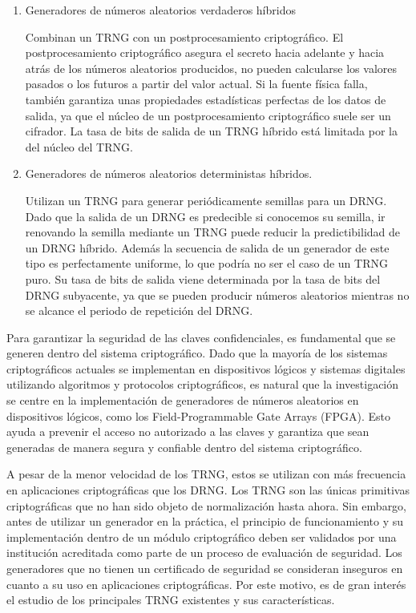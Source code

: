         \begin{enumerate}		
            \item Generadores de números aleatorios verdaderos híbridos
            
            Combinan un TRNG con un postprocesamiento criptográfico. El postprocesamiento criptográfico asegura el secreto hacia adelante y hacia atrás de los números aleatorios producidos, no pueden calcularse los valores pasados o los futuros a partir del valor actual. Si la fuente física falla, también garantiza unas propiedades estadísticas perfectas de los datos de salida, ya que el núcleo de un postprocesamiento criptográfico suele ser un cifrador. La tasa de bits de salida de un TRNG híbrido está limitada por la del núcleo del TRNG.
            
            \item Generadores de números aleatorios deterministas híbridos. 
            
                Utilizan un TRNG para generar periódicamente semillas para un DRNG. Dado que la salida de un DRNG es predecible si conocemos su semilla, ir renovando la semilla mediante un TRNG puede reducir la predictibilidad de un DRNG híbrido. Además la secuencia de salida de un generador de este tipo es perfectamente uniforme, lo que podría no ser el caso de un TRNG puro. Su tasa de bits de salida viene determinada por la tasa de bits del DRNG subyacente, ya que se pueden producir números aleatorios mientras no se alcance el periodo de repetición del DRNG.
        \end{enumerate}

        Para garantizar la seguridad de las claves confidenciales, es fundamental que se generen dentro del sistema criptográfico. Dado que la mayoría de los sistemas criptográficos actuales se implementan en dispositivos lógicos y sistemas digitales utilizando algoritmos y protocolos criptográficos, es natural que la investigación se centre en la implementación de generadores de números aleatorios en dispositivos lógicos, como los Field-Programmable Gate Arrays (FPGA). Esto ayuda a prevenir el acceso no autorizado a las claves y garantiza que sean generadas de manera segura y confiable dentro del sistema criptográfico.
    
        A pesar de la menor velocidad de los TRNG, estos se utilizan con más frecuencia en aplicaciones criptográficas que los DRNG. Los TRNG son las únicas primitivas criptográficas que no han sido objeto de normalización hasta ahora. Sin embargo, antes de utilizar un generador en la práctica, el principio de funcionamiento y su implementación dentro de un módulo criptográfico deben ser validados por una institución acreditada como parte de un proceso de evaluación de seguridad. Los generadores que no tienen un certificado de seguridad se consideran inseguros en cuanto a su uso en aplicaciones criptográficas. Por este motivo, es de gran interés el estudio de los principales TRNG existentes y sus características.

